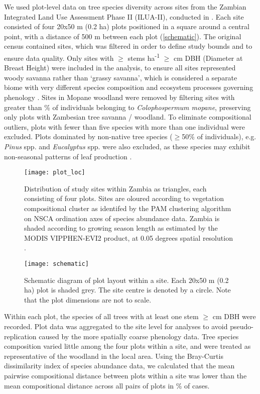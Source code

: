 \documentclass[11pt,a4paper]{article}
\begin{document}
We used plot-level data on tree species diversity across \nSites{} sites from the Zambian Integrated Land Use Assessment Phase II (ILUA-II), conducted in \censusDate{} \citep{Mukosha2009, Pelletier2018}. Each site consisted of four 20x50 m (0.2 ha) plots positioned in a square around a central point, with a distance of 500 m between each plot (\autoref{schematic}). The original census contained \nTotalSites{} sites, which was filtered in order to define study bounds and to ensure data quality. Only sites with $\geq$\stemsHa{} stems ha\textsuperscript{-1} $\geq$\stemSize{} cm DBH (Diameter at Breast Height) were included in the analysis, to ensure all sites represented woody savanna rather than `grassy savanna', which is considered a separate biome with very different species composition and ecosystem processes governing phenology \citep{Parr2014}. Sites in Mopane woodland were removed by filtering sites with greater than \mopanePer{}\% of individuals belonging to \textit{Colophospermum mopane}, preserving only plots with Zambesian tree savanna / woodland. To eliminate compositional outliers, plots with fewer than five species with more than one individual were excluded. Plots dominated by  non-native tree species ($\geq$50\% of individuals), e.g. \textit{Pinus} spp. and \textit{Eucalyptus} spp. were also excluded, as these species may exhibit non-seasonal patterns of leaf production \citep{}.

\begin{figure}[h]
\centering
	\texttt{[image: plot\_loc]}
	\caption{Distribution of study sites within Zambia as triangles, each consisting of four plots. Sites are oloured according to vegetation compositional cluster as identifed by the PAM clustering algorithm on NSCA ordination axes of species abundance data. Zambia is shaded according to growing season length as estimated by the MODIS VIPPHEN-EVI2 product, at 0.05 degrees spatial resolution \citep{VIPPHEN}.}
	\label{plot_loc}
\end{figure}

\begin{figure}[h]
\centering
	\texttt{[image: schematic]}
	\caption{Schematic diagram of plot layout within a site. Each 20x50 m (0.2 ha) plot is shaded grey. The site centre is denoted by a circle. Note that the plot dimensions are not to scale.}
	\label{schematic}
\end{figure}

Within each plot, the species of all trees with at least one stem $\geq$\stemSize{} cm DBH were recorded. Plot data was aggregated to the site level for analyses to avoid pseudo-replication caused by the more spatially coarse phenology data. Tree species composition varied little among the four plots within a site, and were treated as representative of the woodland in the local area. Using the Bray-Curtis dissimilarity index of species abundance data, we calculated that the mean pairwise compositional distance between plots within a site was lower than the mean compositional distance across all pairs of plots in \plotDistPer{}\% of cases. 
\end{document}
